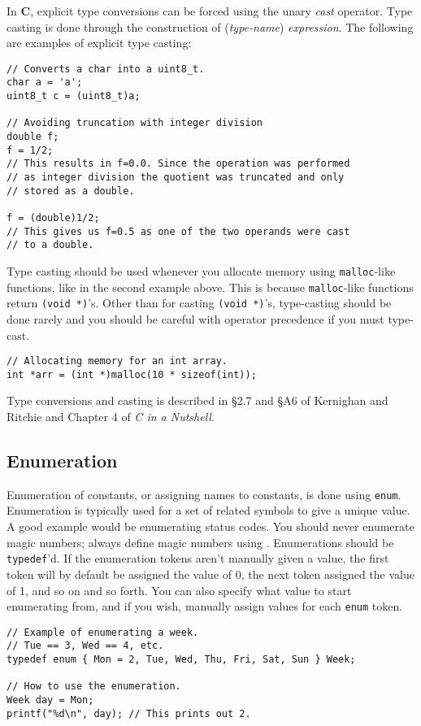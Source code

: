 \documentclass[11pt]{article}
\begin{document}
In \textbf{C}, explicit type conversions can
be forced using the unary \emph{cast} operator. Type casting is done through the
construction of (\emph{type-name}) \emph{expression}. The following are examples
of explicit type casting:
\begin{lstlisting}
// Converts a char into a uint8_t.
char a = 'a';
uint8_t c = (uint8_t)a;

// Avoiding truncation with integer division
double f;
f = 1/2;
// This results in f=0.0. Since the operation was performed
// as integer division the quotient was truncated and only
// stored as a double.

f = (double)1/2;
// This gives us f=0.5 as one of the two operands were cast
// to a double.
\end{lstlisting}

Type casting should be used whenever you allocate memory using
\texttt{malloc}-like functions, like in the second example above. This is
because \texttt{malloc}-like functions return \texttt{(void *)}'s. Other than for
casting \texttt{(void *)}'s, type-casting should be done rarely and you should be
careful with operator precedence if you must type-cast.

\begin{lstlisting}
// Allocating memory for an int array.
int *arr = (int *)malloc(10 * sizeof(int));
\end{lstlisting}

Type conversions and casting is described in \S 2.7 and \S A6 of Kernighan and
Ritchie and Chapter 4 of \emph{C in a Nutshell}.

\subsection{Enumeration}
Enumeration of constants, or assigning names to constants, is done using
\texttt{enum}. Enumeration is typically used for a set of related symbols to
give a unique value. A good example would be enumerating status codes. You
should never enumerate magic numbers; always define magic numbers using
. Enumerations should be \texttt{typedef}'d. If
the enumeration tokens aren't manually given a value, the first token will by
default be assigned the value of 0, the next token assigned the value of 1, and
so on and so forth. You can also specify what value to start enumerating from, and if
you wish, manually assign values for each \texttt{enum} token.

\begin{lstlisting}
// Example of enumerating a week.
// Tue == 3, Wed == 4, etc.
typedef enum { Mon = 2, Tue, Wed, Thu, Fri, Sat, Sun } Week;

// How to use the enumeration.
Week day = Mon;
printf("%d\n", day); // This prints out 2.
\end{lstlisting}
\end{document}
